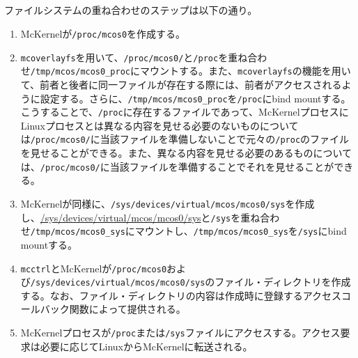 \documentclass[twoside,11pt,fleqn]{book}
\newcommand\textttw[1]{\mathchardef\UrlBreakPenalty=100\mathchardef\UrlBigBreakPenalty=100\url{#1}}
\begin{document}
\subsection{}
ファイルシステムの重ね合わせのステップは以下の通り。
\begin{enumerate}
\item McKernelが\texttt{/proc/mcos0}を作成する。
\item \texttt{mcoverlayfs}を用いて、\texttt{/proc/mcos0/}と\texttt{/proc}を重ね合わせ\texttt{/tmp/mcos/mcos0\_proc}にマウントする。また、\texttt{mcoverlayfs}の機能を用いて、前者と後者に同一ファイルが存在する際には、前者がアクセスされるように設定する。さらに、\texttt{/tmp/mcos/mcos0\_proc}を\texttt{/proc}にbind mountする。こうすることで、\texttt{/proc}に存在するファイルであって、McKernelプロセスにLinuxプロセスとは異なる内容を見せる必要のないものについては\texttt{/proc/mcos0/}に当該ファイルを準備しないことで元々の\texttt{/proc}のファイルを見せることができる。また、異なる内容を見せる必要のあるものについては、\texttt{/proc/mcos0/}に当該ファイルを準備することでそれを見せることができる。
\item McKernelが同様に、\texttt{/sys/devices/virtual/mcos/mcos0/sys}を作成し、\textttw{/sys/devices/virtual/mcos/mcos0/sys}と\texttt{/sys}を重ね合わせ\texttt{/tmp/mcos/mcos0\_sys}にマウントし、\texttt{/tmp/mcos/mcos0\_sys}を\texttt{/sys}にbind mountする。
\item \texttt{mcctrl}とMcKernelが\texttt{/proc/mcos0}および\texttt{/sys/devices/virtual/mcos/mcos0/sys}のファイル・ディレクトリを作成する。なお、ファイル・ディレクトリの内容は作成時に登録するアクセスコールバック関数によって提供される。
\item McKernelプロセスが\texttt{/proc}または\texttt{/sys}ファイルにアクセスする。アクセス要求は必要に応じてLinuxからMcKernelに転送される。
\end{enumerate}
\end{document}
